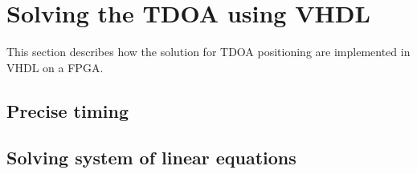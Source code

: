 \section{Solving the TDOA using VHDL}
\label{TDOAVHDL}
This section describes how the solution for TDOA positioning are implemented in VHDL on a FPGA.

\subsection{Precise timing}

\subsection{Solving system of linear equations}

